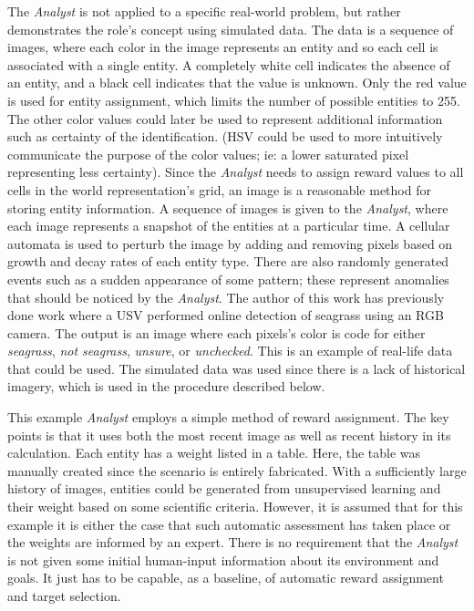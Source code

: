 \documentclass{tamuccthesis}
\begin{document}
The \textit{Analyst} is not applied to a specific real-world problem, but rather demonstrates the role's concept using simulated data. The data is a sequence of images, where each color in the image represents an entity and so each cell is associated with a single entity. A completely white cell indicates the absence of an entity, and a black cell indicates that the value is unknown. Only the red value is used for entity assignment, which limits the number of possible entities to 255. The other color values could later be used to represent additional information such as certainty of the identification. (HSV could be used to more intuitively communicate the purpose of the color values; ie: a lower saturated pixel representing less certainty). Since the \textit{Analyst} needs to assign reward values to all cells in the world representation's grid, an image is a reasonable method for storing entity information. A sequence of images is given to the \textit{Analyst}, where each image represents a snapshot of the entities at a particular time. A cellular automata is used to perturb the image by adding and removing pixels based on growth and decay rates of each entity type. There are also randomly generated events such as a sudden appearance of some pattern; these represent anomalies that should be noticed by the \textit{Analyst}. The author of this work has previously done work where a USV performed online detection of seagrass using an RGB camera. The output is an image where each pixels's color is code for either \textit{seagrass}, \textit{not seagrass}, \textit{unsure}, or \textit{unchecked}. This is an example of real-life data that could be used. The simulated data was used since there is a lack of historical imagery, which is used in the procedure described below. 

This example \textit{Analyst} employs a simple method of reward assignment. The key points is that it uses both the most recent image as well as recent history in its calculation. Each entity has a weight listed in a table. Here, the table was manually created since the scenario is entirely fabricated. With a sufficiently large history of images, entities could be generated from unsupervised learning and their weight based on some scientific criteria. However, it is assumed that for this example it is either the case that such automatic assessment has taken place or the weights are informed by an expert. There is no requirement that the \textit{Analyst} is not given some initial human-input information about its environment and goals. It just has to be capable, as a baseline, of automatic reward assignment and target selection. 
\end{document}
